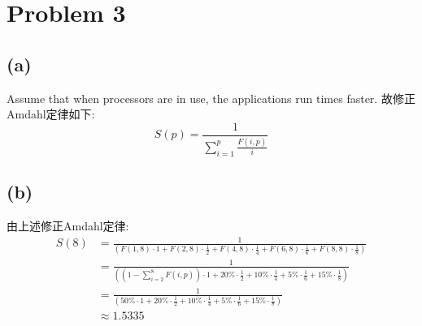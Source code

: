 \documentclass{article}
\begin{document}
\section*{Problem 3}
\subsection*{(a)}
Assume that when processors are in use, the applications run times faster.
故修正Amdahl定律如下:
\[
    S(p) = \frac{1}{\sum_{i=1}^{p} \frac{F(i, p)}{i}}
\]

\subsection*{(b)}
由上述修正Amdahl定律:
\begin{align*}
    S(8) & = \frac{1}{\left(F(1, 8) \cdot 1 + F(2, 8) \cdot \frac{1}{2} + F(4, 8) \cdot \frac{1}{4} + F(6, 8) \cdot \frac{1}{6} + F(8, 8) \cdot \frac{1}{8}\right)}                 \\
         & = \frac{1}{\left(\left(1-\sum_{i=2}^{8}F(i, p)\right) \cdot 1 + 20\% \cdot \frac{1}{2} + 10\% \cdot \frac{1}{4} + 5\% \cdot \frac{1}{6} + 15\% \cdot \frac{1}{8}\right)} \\
         & = \frac{1}{\left(50\% \cdot 1 + 20\% \cdot \frac{1}{2} + 10\% \cdot \frac{1}{4} + 5\% \cdot \frac{1}{6} + 15\% \cdot \frac{1}{8}\right)}                                 \\
         & \approx1.5335
\end{align*}
\end{document}
